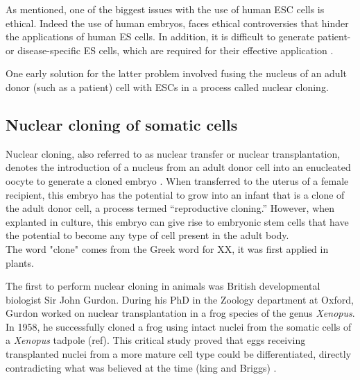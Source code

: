 

As mentioned, one of the biggest issues with the use of human ESC cells is ethical.
Indeed the use of human embryos, faces ethical controversies that hinder the applications of human ES cells. 
In addition, it is difficult to generate patient- or disease-specific ES cells, which are required for their effective application \cite{yamanaka2007strategies}.

One early solution for the latter problem involved fusing the nucleus of an adult donor (such as a patient) cell with ESCs in a process called nuclear cloning.

\subsection{Nuclear cloning of somatic cells}
\label{sec:cloning} 

Nuclear cloning, also referred to as nuclear transfer or nuclear transplantation, denotes the introduction of a nucleus from an adult donor cell into an enucleated oocyte to generate a cloned embryo \cite{hochedlinger2003nuclear}.
When transferred to the uterus of a female recipient, this embryo has the potential to grow into an infant that is a clone of the adult donor cell, a process termed “reproductive cloning.” 
However, when explanted in culture, this embryo can give rise to embryonic stem cells that have the potential to become any 
type of cell present in the adult body.\\

The word "clone" comes from the Greek word for XX, it was first applied in plants.

The first to perform nuclear cloning in animals was British developmental biologist Sir John Gurdon. 
During his PhD in the Zoology department at Oxford, Gurdon worked on nuclear transplantation in a frog species of the genus \textit{Xenopus}.
In 1958, he successfully cloned a frog using intact nuclei from the somatic cells of a \textit{Xenopus} tadpole (ref).
This critical study proved that eggs receiving transplanted nuclei from a more mature cell type could be differentiated, directly contradicting what was believed at the time (king and Briggs) \cite{king1955changes}. \\

